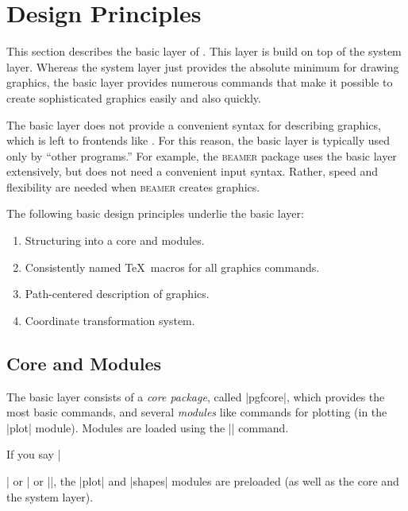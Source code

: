 %
%
%


\section{Design Principles}

This section describes the basic layer of \pgfname. This layer is
build on top of the system layer. Whereas the system layer just
provides the absolute minimum for drawing graphics, the basic
layer provides numerous commands that make it possible to create
sophisticated graphics easily and also quickly.

The basic layer does not provide a convenient syntax for describing
graphics, which is left to frontends like \tikzname. For this reason, the
basic layer is typically used only by ``other programs.'' For example,
the \textsc{beamer} package uses the basic layer extensively, but does
not need a convenient input syntax. Rather, speed and flexibility are
needed when \textsc{beamer} creates graphics.

The following basic design principles underlie the basic layer:
\begin{enumerate}
\item Structuring into a core and modules.
\item Consistently named \TeX\ macros for all graphics commands.
\item Path-centered description of graphics.
\item Coordinate transformation system.
\end{enumerate}



\subsection{Core and Modules}

The basic layer consists of a \emph{core package}, called |pgfcore|,
which provides the most basic commands, and several
\emph{modules} like commands for plotting (in the |plot| module).
Modules are loaded using the |\usepgfmodule| command.

If you say |\usepackage{pgf}| or | or
|\usemodule[pgf]|, the |plot| and |shapes| modules are preloaded (as
well as the core and the system layer).



